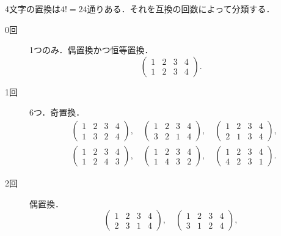 \documentclass[a4paper,10pt,fleqn]{ltjsarticle}
\begin{document}
\begin{tleftbar}
    4文字の置換は$4!=24$通りある．それを互換の回数によって分類する．
    \begin{description}
        \item[0回] 1つのみ．偶置換かつ恒等置換．
              \[
                  \begin{pmatrix} 1 & 2 & 3 &4 \\ 1 & 2 & 3 &4\end{pmatrix}.
              \]
        \item [1回] 6つ．奇置換．
              \begin{align*}
                   & \begin{pmatrix} 1 & 2 & 3 & 4\\ 1 & 3 & 2 & 4\end{pmatrix},\quad
                  \begin{pmatrix} 1 & 2 & 3 &4 \\ 3 & 2 & 1  & 4\end{pmatrix},\quad
                  \begin{pmatrix} 1 & 2 & 3 & 4\\ 2 & 1 & 3 & 4\end{pmatrix},         \\
                   & \begin{pmatrix} 1 & 2 & 3 & 4\\ 1 & 2 & 4 & 3\end{pmatrix},\quad
                  \begin{pmatrix} 1 & 2 & 3 & 4\\ 1 & 4 & 3 & 2\end{pmatrix},\quad
                  \begin{pmatrix} 1 & 2 & 3 & 4\\ 4 & 2 & 3 & 1\end{pmatrix}.
              \end{align*}
        \item [2回] 偶置換．
              \[
                  \begin{pmatrix} 1 & 2 & 3 & 4 \\ 2 & 3 & 1 & 4\end{pmatrix},\quad
                  \begin{pmatrix} 1 & 2 & 3 & 4 \\ 3 & 1 & 2 & 4 \end{pmatrix},
              \]
    \end{description}
\end{tleftbar}
\end{document}
